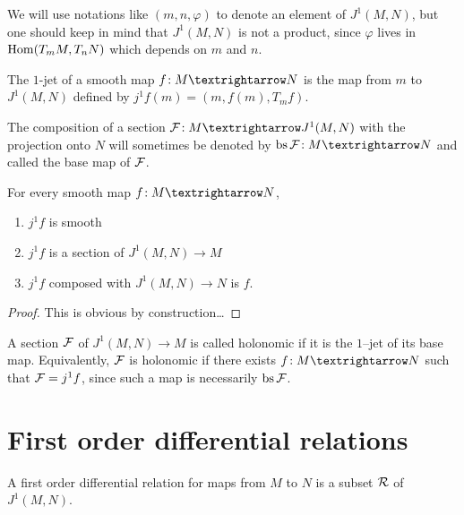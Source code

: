 We will use notations like $(m, n, φ)$ to denote an element
of $J^1(M, N)$,
but one should keep in mind that $J^1(M, N)$ is not a product,
since $φ$ lives in $\operatorname{Hom}(T_mM, T_nN)$ which depends on $m$ and $n$.


\begin{definition}
\label{def:one_jet_extension}
The $1$-jet of a smooth map $f \co M → N$ is the map from
$m$ to $J^1(M, N)$ defined by $j^1f(m) = (m, f(m), T_mf)$.
\end{definition}

The composition of a section $\F \co M → J^1(M, N)$ with the projection
onto $N$ will sometimes be denoted by $\bs \F \co M → N$ and called the
base map of $\mathcal{F}$.

\begin{lemma}
\label{lem:one_jet_extension_prop}
For every smooth map $f \co M → N$,
\begin{enumerate}
  \item
    \label{lem:one_jet_smooth}
    $j^1f$ is smooth
  \item
    \label{lem:one_jet_section}
    $j^1f$ is a section of $J^1(M, N) → M$
  \item
    \label{lem:one_jet_zero_jet}
    $j^1f$ composed with $J^1(M, N) → N$ is $f$.
\end{enumerate}
\end{lemma}

\begin{proof}
  This is obvious by construction\dots
\end{proof}

\begin{definition}
\label{def:holonomic_section}
A section $\mathcal{F}$ of $J^1(M, N) → M$ is called holonomic if it is the
$1$--jet of its base map.
Equivalently, $\mathcal{F}$ is holonomic if there exists
$f \co M → N$ such that $\mathcal{F} = j^1f$, since such a map is
necessarily $\operatorname{bs} \mathcal{F}$.
\end{definition}

\section{First order differential relations}

\begin{definition}
  \label{def:rel}
  A first order differential relation for maps from $M$ to $N$ is a
  subset $\mathcal{R}$ of $J^1(M, N)$.
\end{definition}

